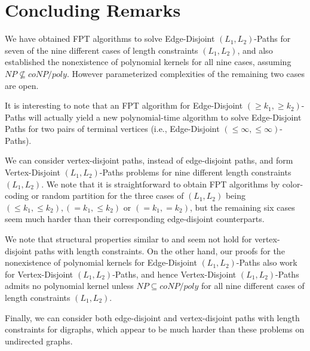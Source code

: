 \documentclass{llncs}
\begin{document}
\section{Concluding Remarks}

We have obtained FPT algorithms to solve {\sc Edge-Disjoint $(L_1,L_2)$-Paths}
for seven of the nine different cases of length constraints $(L_1,L_2)$,
and also established the nonexistence of polynomial kernels for all nine cases,
assuming $NP \not\subseteq coNP/poly$.
However parameterized complexities of the remaining two cases are open. 


It is interesting to note that an FPT algorithm for
{\sc Edge-Disjoint $(\ge k_1, \ge k_2)$-Paths} will actually yield a new polynomial-time
algorithm to solve {\sc Edge-Disjoint Paths} for two pairs of terminal vertices (i.e.,
{\sc Edge-Disjoint $(\le \infty, \le \infty)$-Paths}).

We can consider vertex-disjoint paths, instead of edge-disjoint paths,
and form {\sc Vertex-Disjoint $(L_1,L_2)$-Paths} problems for nine different length
constraints $(L_1,L_2)$.
We note that it is straightforward to obtain FPT algorithms by color-coding
or random partition for the three cases of $(L_1,L_2)$
being $(\le k_1, \le k_2), (= k_1, \le k_2)$ or $(= k_1, = k_2)$,
but the remaining six cases seem much harder than their corresponding edge-disjoint
counterparts.


We note that structural properties similar to  and
seem not hold for vertex-disjoint paths with length constraints.
On the other hand, our proofs for the nonexistence of polynomial kernels for 
{\sc Edge-Disjoint $(L_1,L_2)$-Paths} also work for {\sc Vertex-Disjoint $(L_1,L_2)$-Paths}, and hence
{\sc Vertex-Disjoint $(L_1,L_2)$-Paths} admits no polynomial kernel
unless $NP \subseteq coNP /poly$ for all nine different cases of length constraints
$(L_1,L_2)$.

Finally, we can consider both edge-disjoint and vertex-disjoint paths with length constraints
for digraphs, which appear to be much harder than these problems on undirected graphs.




\end{document}
